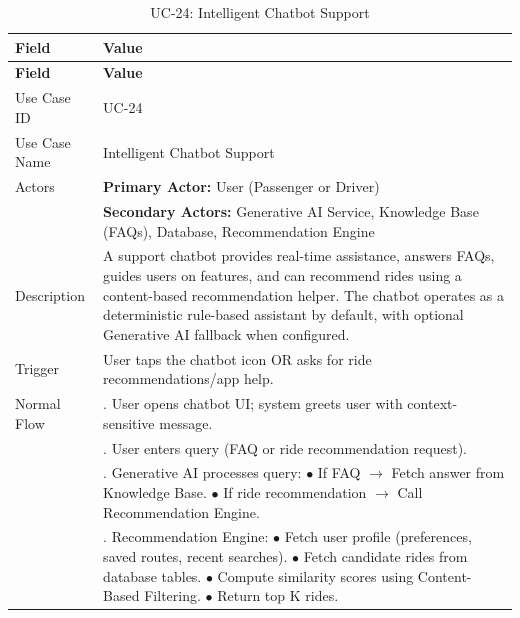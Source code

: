 \begin{longtable}{|>{\raggedright\arraybackslash}p{4cm}|>{\raggedright\arraybackslash}p{11cm}|}
\caption{UC-24: Intelligent Chatbot Support}
\label{tab:uc-24} \\
\hline
\rowcolor{lightgray!30}
\textbf{Field} & \textbf{Value} \\
\hline
\endfirsthead
\hline
\rowcolor{lightgray!30}
\textbf{Field} & \textbf{Value} \\
\hline
\endhead
\hline
\endfoot
\hline
\endlastfoot
Use Case ID & UC-24 \\
\hline
Use Case Name & Intelligent Chatbot Support \\
\hline
Actors & \textbf{Primary Actor:} User (Passenger or Driver) \\
& \textbf{Secondary Actors:} Generative AI Service, Knowledge Base (FAQs), Database, Recommendation Engine \\
\hline
Description & A support chatbot provides real-time assistance, answers FAQs, guides users on features, and can recommend rides using a content-based recommendation helper. The chatbot operates as a deterministic rule-based assistant by default, with optional Generative AI fallback when configured. \\
\hline
Trigger & User taps the chatbot icon OR asks for ride recommendations/app help. \\
\hline
Normal Flow & 1. User opens chatbot UI; system greets user with context-sensitive message. \\
& 2. User enters query (FAQ or ride recommendation request). \\
& 3. Generative AI processes query: \newline $\bullet$ If FAQ $\rightarrow$ Fetch answer from Knowledge Base. \newline $\bullet$ If ride recommendation $\rightarrow$ Call Recommendation Engine. \\
& 4. Recommendation Engine: \newline $\bullet$ Fetch user profile (preferences, saved routes, recent searches). \newline $\bullet$ Fetch candidate rides from database tables. \newline $\bullet$ Compute similarity scores using Content-Based Filtering. \newline $\bullet$ Return top K rides. \\

\end{longtable}
